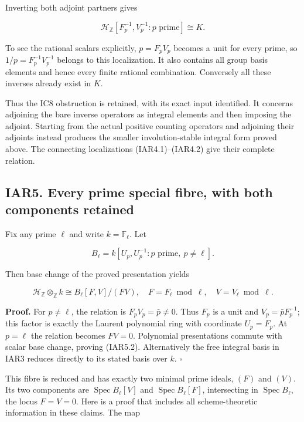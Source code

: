 \documentclass[
]{article}
\begin{document}
Inverting both adjoint partners gives

\[
\mathcal H_{\mathbb Z}[F_p^{-1},V_p^{-1}:p\text{ prime}]
\cong K.
\tag{IAR4.2}
\]

To see the rational scalars explicitly, \(p=F_pV_p\) becomes a unit for
every prime, so \(1/p=F_p^{-1}V_p^{-1}\) belongs to this localization.
It also contains all group basis elements and hence every finite
rational combination. Conversely all these inverses already exist in
\(K\).

Thus the IC8 obstruction is retained, with its exact input identified.
It concerns adjoining the bare inverse operators as integral elements
and then imposing the adjoint. Starting from the actual positive
counting operators and adjoining their adjoints instead produces the
smaller involution-stable integral form proved above. The connecting
localizations (IAR4.1)--(IAR4.2) give their complete relation.

\subsection{IAR5. Every prime special fibre, with both components
retained}\label{iar5.-every-prime-special-fibre-with-both-components-retained}

Fix any prime \(\ell\) and write \(k=\mathbb F_\ell\). Let

\[
B_\ell=k[U_p,U_p^{-1}:p\text{ prime},\ p\ne\ell].
\tag{IAR5.1}
\]

Then base change of the proved presentation yields

\[
\boxed{
\mathcal H_{\mathbb Z}\otimes_{\mathbb Z}k
\cong B_\ell[F,V]/(FV),}
\quad F=F_\ell\bmod\ell,\quad V=V_\ell\bmod\ell.
\tag{IAR5.2}
\]

\textbf{Proof.} For \(p\ne\ell\), the relation is \(F_pV_p=\bar p\ne0\).
Thus \(F_p\) is a unit and \(V_p=\bar p F_p^{-1}\); this factor is
exactly the Laurent polynomial ring with coordinate \(U_p=F_p\). At
\(p=\ell\) the relation becomes \(FV=0\). Polynomial presentations
commute with scalar base change, proving (IAR5.2). Alternatively the
free integral basis in IAR3 reduces directly to its stated basis over
\(k\). \(\square\)

This fibre is reduced and has exactly two minimal prime ideals, \((F)\)
and \((V)\). Its two components are \(\operatorname{Spec}B_\ell[V]\) and
\(\operatorname{Spec}B_\ell[F]\), intersecting in
\(\operatorname{Spec}B_\ell\), the locus \(F=V=0\). Here is a proof that
includes all scheme-theoretic information in these claims. The map
\end{document}
